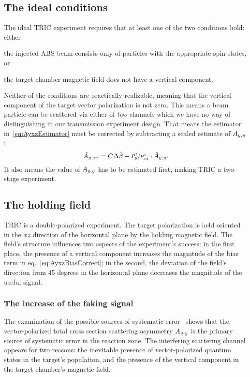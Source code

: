\documentclass{article}
\begin{document}

\subsection{The ideal conditions}
The ideal TRIC experiment requires that at least one of the two conditions hold: either
\begin{inparaenum}[1)]
	\item the injected ABS beam consists only of particles with the appropriate spin states, or
	\item the target chamber magnetic field does not have a vertical component.
\end{inparaenum}

Neither of the conditions are practically realizable, meaning that the vertical component of the target vector polarization is not zero. This means a beam particle can be scattered via either of \emph{two} channels which we have no way of distinguishing in our transmission experiment design. That means the estimator in~\eqref{eq:AyxzEstimator} must be corrected by subtracting a scaled estimate of $\Ayy$: 
\begin{equation}\label{eq:AyxzBiasCorrect}
\Ayxz* = C\Delta\slp* - \sfrac{P^t_y}{P^t_{xz}}\cdot\Ayy*.
\end{equation}
It also means the value of $\Ayy$ has to be estimated first, making TRIC a two-stage experiment.


\subsection{The holding field}

TRIC is a double-polarized experiment. The target polarization is held oriented in the $xz$ direction of the horizontal plane by the holding magnetic field. The field's structure influences two aspects of the experiment's success: in the first place, the presence of a vertical component increases the magnitude of the bias term in eq.~\eqref{eq:AyxzBiasCorrect}; in the second, the deviation of the field's direction from 45 degrees in the horizontal plane decreases the magnitude of the useful signal.

\subsubsection{The increase of the faking signal}
The examination of the possible sources of systematic error~\cite{Proposal} shows that the vector-polarized total cross section scattering asymmetry $\Ayy$ is the primary source of systematic error in the reaction zone. The interfering scattering channel appears for two reasons: the inevitable presence of vector-polarized quantum states in the target's population, and the presence of the vertical component in the target chamber's magnetic field. 
\end{document}
